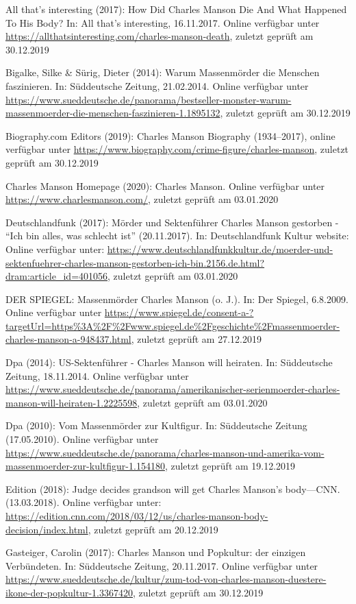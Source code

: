 \documentclass[
]{article}
\begin{document}
All that's interesting (2017): How Did Charles Manson Die And What
Happened To His Body? In: All that's interesting, 16.11.2017. Online
verfügbar unter
\url{https://allthatsinteresting.com/charles-manson-death}, zuletzt
geprüft am 30.12.2019

Bigalke, Silke \& Sürig, Dieter (2014): Warum Massenmörder die Menschen
faszinieren. In: Süddeutsche Zeitung, 21.02.2014. Online verfügbar unter
\url{https://www.sueddeutsche.de/panorama/bestseller-monster-warum-massenmoerder-die-menschen-faszinieren-1.1895132},
zuletzt geprüft am 30.12.2019

Biography.com Editors (2019): Charles Manson Biography (1934--2017),
online verfügbar unter
\url{https://www.biography.com/crime-figure/charles-manson}, zuletzt
geprüft am 30.12.2019

Charles Manson Homepage (2020): Charles Manson. Online verfügbar unter
\url{https://www.charlesmanson.com/}, zuletzt geprüft am 03.01.2020

Deutschlandfunk (2017): Mörder und Sektenführer Charles Manson gestorben
- ``Ich bin alles, was schlecht ist'' (20.11.2017). In: Deutschlandfunk
Kultur website: Online verfügbar unter:
\url{https://www.deutschlandfunkkultur.de/moerder-und-sektenfuehrer-charles-manson-gestorben-ich-bin.2156.de.html?dram:article_id=401056},
zuletzt geprüft am 03.01.2020

DER SPIEGEL: Massenmörder Charles Manson (o. J.). In: Der Spiegel,
6.8.2009. Online verfügbar unter
\url{https://www.spiegel.de/consent-a-?targetUrl=https\%3A\%2F\%2Fwww.spiegel.de\%2Fgeschichte\%2Fmassenmoerder-charles-manson-a-948437.html},
zuletzt geprüft am 27.12.2019

Dpa (2014): US-Sektenführer - Charles Manson will heiraten. In:
Süddeutsche Zeitung, 18.11.2014. Online verfügbar unter
\url{https://www.sueddeutsche.de/panorama/amerikanischer-serienmoerder-charles-manson-will-heiraten-1.2225598},
zuletzt geprüft am 03.01.2020

Dpa (2010): Vom Massenmörder zur Kultfigur. In: Süddeutsche Zeitung
(17.05.2010). Online verfügbar unter
\url{https://www.sueddeutsche.de/panorama/charles-manson-und-amerika-vom-massenmoerder-zur-kultfigur-1.154180},
zuletzt geprüft am 19.12.2019

Edition (2018): Judge decides grandson will get Charles Manson's
body---CNN. (13.03.2018). Online verfügbar unter:
\url{https://edition.cnn.com/2018/03/12/us/charles-manson-body-decision/index.html},
zuletzt geprüft am 20.12.2019

Gasteiger, Carolin (2017): Charles Manson und Popkultur: der einzigen
Verbündeten. In: Süddeutsche Zeitung, 20.11.2017. Online verfügbar unter
\url{https://www.sueddeutsche.de/kultur/zum-tod-von-charles-manson-duestere-ikone-der-popkultur-1.3367420},
zuletzt geprüft am 30.12.2019
\end{document}
